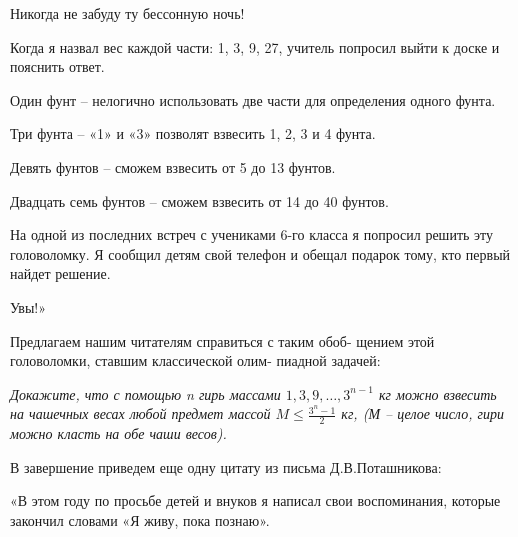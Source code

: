 \begin{flushleft}
\begin{multicols}{2}
Никогда не забуду ту бессонную ночь!

Когда я назвал вес каждой части: 1, 3, 9, 27, учитель
попросил выйти к доске и пояснить ответ.

Один фунт – нелогично использовать две части для
определения одного фунта.

Три фунта – «1» и «3» позволят взвесить 1, 2, 3 и 4
фунта.

Девять фунтов – сможем взвесить от 5 до 13 фунтов.

Двадцать семь фунтов – сможем взвесить от 14 до 40
фунтов.

На одной из последних встреч с учениками 6-го класса
я попросил решить эту головоломку. Я сообщил детям
свой телефон и обещал подарок тому, кто первый найдет
решение.

Увы!»

Предлагаем нашим читателям справиться с таким обоб-
щением этой головоломки, ставшим классической олим-
пиадной задачей:

\textit{Докажите, что с помощью n гирь массами $1, 3, 9,
\ldots,3^{n-1}$ кг можно взвесить на чашечных весах любой
предмет массой $\displaystyle M \le \frac{3^n-1}{2}$ кг, (М – целое число, гири
можно класть на обе чаши весов).}

В завершение приведем еще одну цитату из письма
Д.В.Поташникова:

«В этом году по просьбе детей и внуков я написал свои
воспоминания, которые закончил словами «Я живу, пока
познаю».

\end{multicols}
\end{flushleft}
